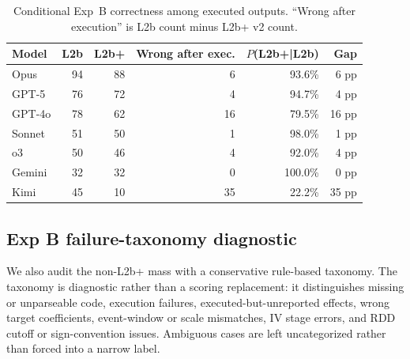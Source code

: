 \documentclass{article}
\begin{document}
\begin{table}[h]
\centering
\caption{Conditional Exp~B correctness among executed outputs. ``Wrong after
execution'' is L2b count minus L2b+ v2 count.}
\label{tab:conditional-l2b}
\small
\renewcommand{\arraystretch}{1.08}
\begin{tabular}{lrrrrr}
\toprule
\textbf{Model} & \textbf{L2b} & \textbf{L2b+} &
\textbf{Wrong after exec.} & \textbf{$P$(L2b+|L2b)} & \textbf{Gap} \\
\midrule
Opus & 94 & 88 & 6 & 93.6\% & 6 pp \\
GPT-5 & 76 & 72 & 4 & 94.7\% & 4 pp \\
GPT-4o & 78 & 62 & 16 & 79.5\% & 16 pp \\
Sonnet & 51 & 50 & 1 & 98.0\% & 1 pp \\
o3 & 50 & 46 & 4 & 92.0\% & 4 pp \\
Gemini & 32 & 32 & 0 & 100.0\% & 0 pp \\
Kimi & 45 & 10 & 35 & 22.2\% & 35 pp \\
\bottomrule
\end{tabular}
\end{table}

\subsection{Exp B failure-taxonomy diagnostic}
\label{app:failure_taxonomy}

We also audit the non-L2b+ mass with a conservative rule-based taxonomy. The
taxonomy is diagnostic rather than a scoring replacement: it distinguishes
missing or unparseable code, execution failures, executed-but-unreported
effects, wrong target coefficients, event-window or scale mismatches, IV stage
errors, and RDD cutoff or sign-convention issues. Ambiguous cases are left
uncategorized rather than forced into a narrow label.
\end{document}
